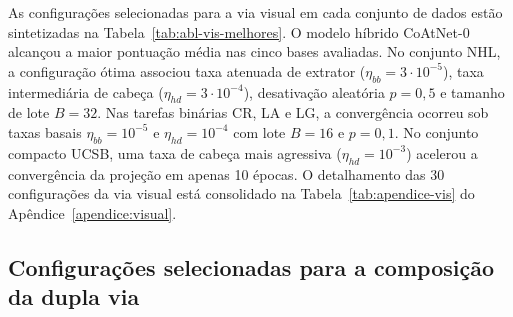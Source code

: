 As configurações selecionadas para a via visual em cada conjunto de dados estão sintetizadas na Tabela~\ref{tab:abl-vis-melhores}. O modelo híbrido CoAtNet-0 alcançou a maior pontuação média nas cinco bases avaliadas. No conjunto NHL, a configuração ótima associou taxa atenuada de extrator ($\eta_{bb} = 3\cdot 10^{-5}$), taxa intermediária de cabeça ($\eta_{hd} = 3\cdot 10^{-4}$), desativação aleatória $p = 0{,}5$ e tamanho de lote $B = 32$. Nas tarefas binárias CR, LA e LG, a convergência ocorreu sob taxas basais $\eta_{bb} = 10^{-5}$ e $\eta_{hd} = 10^{-4}$ com lote $B = 16$ e $p = 0{,}1$. No conjunto compacto UCSB, uma taxa de cabeça mais agressiva ($\eta_{hd} = 10^{-3}$) acelerou a convergência da projeção em apenas 10 épocas. O detalhamento das 30 configurações da via visual está consolidado na Tabela~\ref{tab:apendice-vis} do Apêndice~\ref{apendice:visual}.

\begin{table}[htb]
\centering
\caption{Configurações ótimas de hiperparâmetros e desempenhos dos modelos selecionados na via visual por conjunto de dados.}
\label{tab:abl-vis-melhores}
\small
{}
\end{table}

\subsection{Configurações selecionadas para a composição da dupla via}
\label{subsec:configuracoes-selecionadas}

